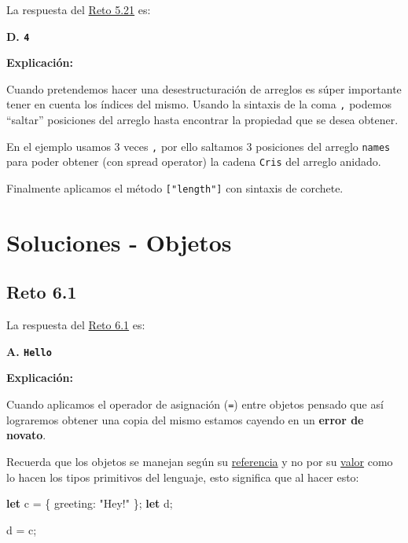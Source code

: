 \documentclass[
  letterpaper,
  DIV=11,
  numbers=noendperiod]{scrreprt}
\newenvironment{Shaded}{\begin{snugshade}}{\end{snugshade}}
\newcommand{\DataTypeTok}[1]{\textcolor[rgb]{0.68,0.00,0.00}{#1}}
\newcommand{\KeywordTok}[1]{\textcolor[rgb]{0.00,0.23,0.31}{\textbf{#1}}}
\newcommand{\NormalTok}[1]{\textcolor[rgb]{0.00,0.23,0.31}{#1}}
\newcommand{\OperatorTok}[1]{\textcolor[rgb]{0.37,0.37,0.37}{#1}}
\newcommand{\StringTok}[1]{\textcolor[rgb]{0.13,0.47,0.30}{#1}}
\begin{document}
La respuesta del \hyperref[sec-cap5-reto21]{Reto 5.21} es:

\textbf{D. \texttt{4}}

\textbf{Explicación:}

Cuando pretendemos hacer una desestructuración de arreglos es súper
importante tener en cuenta los índices del mismo. Usando la sintaxis de
la coma \texttt{,} podemos ``saltar'' posiciones del arreglo hasta
encontrar la propiedad que se desea obtener.

En el ejemplo usamos 3 veces \texttt{,} por ello saltamos 3 posiciones
del arreglo \texttt{names} para poder obtener (con spread operator) la
cadena \texttt{Cris} del arreglo anidado.

Finalmente aplicamos el método \texttt{{[}"length"{]}} con sintaxis de
corchete.

\chapter{Soluciones - Objetos}\label{soluciones---objetos}

\section{Reto 6.1}\label{sec-sol-cap6-reto1}

La respuesta del \hyperref[sec-cap6-reto1]{Reto 6.1} es:

\textbf{A. \texttt{Hello}}

\textbf{Explicación:}

Cuando aplicamos el operador de asignación (\texttt{=}) entre objetos
pensado que así lograremos obtener una copia del mismo estamos cayendo
en un \textbf{error de novato}.

Recuerda que los objetos se manejan según su
\hyperref[glos-referencia]{referencia} y no por su
\hyperref[glos-valor]{valor} como lo hacen los tipos primitivos del
lenguaje, esto significa que al hacer esto:

\begin{Shaded}
\begin{Highlighting}[]
\KeywordTok{let}\NormalTok{ c }\OperatorTok{=}\NormalTok{ \{ }\DataTypeTok{greeting}\OperatorTok{:} \StringTok{"Hey!"}\NormalTok{ \}}\OperatorTok{;}
\KeywordTok{let}\NormalTok{ d}\OperatorTok{;}

\NormalTok{d }\OperatorTok{=}\NormalTok{ c}\OperatorTok{;}
\end{Highlighting}
\end{Shaded}
\end{document}
